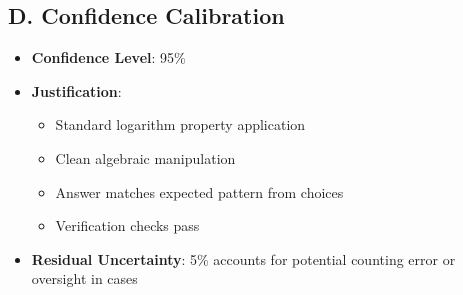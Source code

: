 \documentclass[]{article}
\begin{document}
\begin{verificationbox}
\subsection*{D. Confidence Calibration}
\begin{itemize}[leftmargin=*]
    \item \textbf{Confidence Level}: 95\%
    
    \item \textbf{Justification}:
    \begin{itemize}
        \item Standard logarithm property application
        \item Clean algebraic manipulation
        \item Answer matches expected pattern from choices
        \item Verification checks pass
    \end{itemize}
    
    \item \textbf{Residual Uncertainty}: 5\% accounts for potential counting error or oversight in cases
\end{itemize}
\end{verificationbox}
\end{document}

